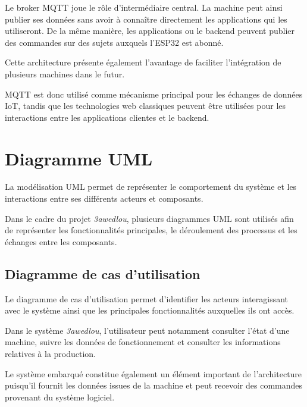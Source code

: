 Le broker MQTT joue le rôle d'intermédiaire central. La machine peut ainsi
publier ses données sans avoir à connaître directement les applications
qui les utiliseront. De la même manière, les applications ou le backend
peuvent publier des commandes sur des sujets auxquels l'ESP32 est abonné.

Cette architecture présente également l'avantage de faciliter
l'intégration de plusieurs machines dans le futur.

MQTT est donc utilisé comme mécanisme principal pour les échanges de
données IoT, tandis que les technologies web classiques peuvent être
utilisées pour les interactions entre les applications clientes et le
backend.

\section{Diagramme UML}

La modélisation UML permet de représenter le comportement du système et
les interactions entre ses différents acteurs et composants.

Dans le cadre du projet \textit{3awedlou}, plusieurs diagrammes UML sont
utilisés afin de représenter les fonctionnalités principales, le
déroulement des processus et les échanges entre les composants.

\subsection{Diagramme de cas d'utilisation}

Le diagramme de cas d'utilisation permet d'identifier les acteurs
interagissant avec le système ainsi que les principales fonctionnalités
auxquelles ils ont accès.

Dans le système \textit{3awedlou}, l'utilisateur peut notamment consulter
l'état d'une machine, suivre les données de fonctionnement et consulter
les informations relatives à la production.

Le système embarqué constitue également un élément important de
l'architecture puisqu'il fournit les données issues de la machine et peut
recevoir des commandes provenant du système logiciel.

%

